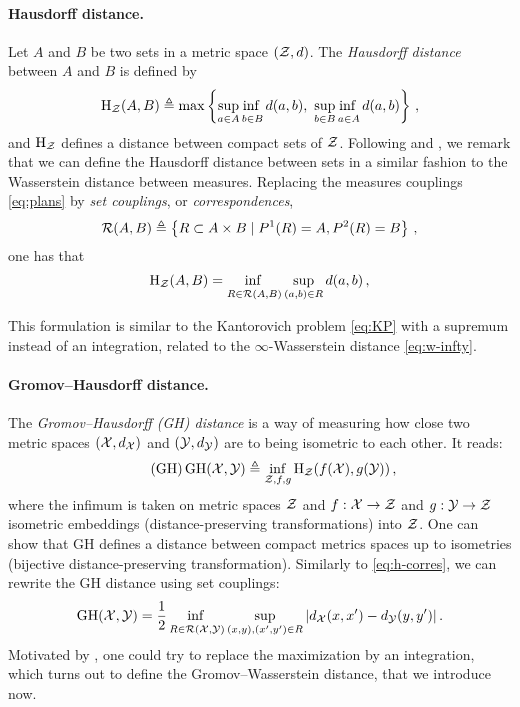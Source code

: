         \paragraph{Hausdorff distance.} Let $A$ and $B$ be two sets in a metric space $(\mathcal{Z},d)$. The \emph{Hausdorff distance} between $A$ and $B$ is defined by
        \begin{equation*}
            \operatorname{H}_\Zz(A, B) \defeq \max \left\{\adjustlimits\sup _{a \in A} \inf _{b \in B} d(a, b),\ \adjustlimits\sup _{b \in B} \inf _{a \in A} d(a, b)\right\}\,,
        \end{equation*}
        and $\operatorname{H}_{\mathcal{Z}}$ defines a distance between compact sets of $\mathcal{Z}$. Following \cite{memoli2011gromov} and \cite{peyre2019computational}, we remark that we can define the Hausdorff distance between sets in a similar fashion to the Wasserstein distance between measures. Replacing the measures couplings \cref{eq:plans} by \emph{set couplings}, or \emph{correspondences},
        $$\mathcal{R}(A,B)\triangleq \left\{R\subset A\times B\mid P^1(R)=A,P^{2}(R)=B \right\}\,,$$
        one has that
        \begin{equation}
            \operatorname{H}_\Zz(A, B) = \adjustlimits\inf_{R\in \Rr(A,B)}\sup_{(a,b)\in R} d(a,b)\,,
            \label{eq:h-corres}
        \end{equation}
        \begin{remark}
            \label{rem:sup-integration}
            This formulation is similar to the Kantorovich problem \cref{eq:KP} with a supremum instead of an integration, related to the $\infty$-Wasserstein distance \cref{eq:w-infty}.
        \end{remark}

        \paragraph{Gromov--Hausdorff distance.} The \emph{Gromov--Hausdorff (GH) distance} \cite{gromov1999metric} is a way of measuring how close two metric spaces $(\mathcal{X},d_{\mathcal{X}})$ and $(\mathcal{Y},d_{\mathcal{Y}})$ are to being isometric to each other. It reads:
        \begin{equation}
            \tag{GH}
            \operatorname{GH}(\mathcal{X},\mathcal{Y})\triangleq \inf_{\mathcal{Z},f,g} \operatorname{H}_{\mathcal{Z}}(f(\mathcal{X}),g(\mathcal{Y}))\,,
        \end{equation}
        where the infimum is taken on metric spaces $\mathcal{Z}$ and $f:\mathcal{X}\to\mathcal{Z}$ and $g:\mathcal{Y}\to\mathcal{Z}$ isometric embeddings (distance-preserving transformations) into $\mathcal{Z}$. One can show that GH defines a distance between compact metrics spaces up to isometries (bijective distance-preserving transformation). Similarly to \cref{eq:h-corres}, we can rewrite the GH distance using set couplings:
        \begin{equation}
            \operatorname{GH}(\Xx,\Yy)=\frac12 \adjustlimits\inf_{R\in\Rr(\Xx,\Yy)}\sup_{(x,y),(x',y')\in R} |d_\Xx(x,x')-d_\Yy(y,y')|\,.
            \label{eq:GH}
        \end{equation}
        Motivated by , one could try to replace the maximization by an integration, which turns out to define the Gromov--Wasserstein distance, that we introduce now.

